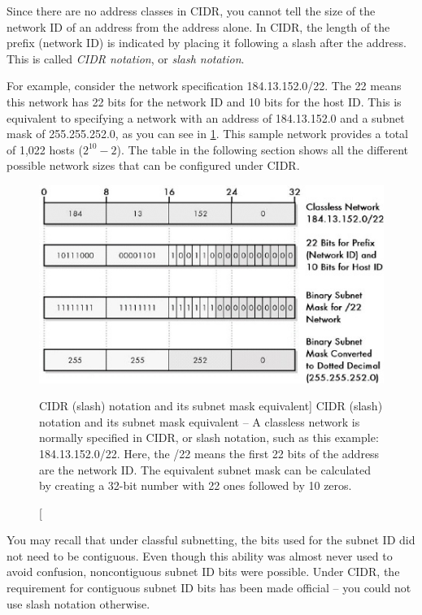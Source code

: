 \begin{keyconcept}
Since there are no address classes in CIDR, you cannot tell the size of the network ID of an address from the address alone.
In CIDR, the length of the prefix (network ID) is indicated by placing it following a slash after the address.
This is called \emph{CIDR notation}, or \emph{slash notation}.
\end{keyconcept}

For example, consider the network specification 184.13.152.0/22. The 22
means this network has 22 bits for the network ID and 10 bits for the
host ID. This is equivalent to specifying a network with an address of
184.13.152.0 and a subnet mask of 255.255.252.0, as you can see in \cref{fig:cidr-notation}.
This sample network provides a total of 1,022 hosts ($2^{10}-2$).
The table in the following section shows all the different possible network sizes that can be configured under CIDR.


\begin{figure}
   \centering
   \includegraphics[width=.7\textwidth]{images/cidr-notation.jpg}
   \caption
      [CIDR (slash) notation and its subnet mask equivalent]
      {CIDR (slash) notation and its subnet mask equivalent -- A
      classless network is normally specified in CIDR, or slash notation, such
      as this example: 184.13.152.0/22. Here, the /22 means the first 22 bits
      of the address are the network ID. The equivalent subnet mask can be
      calculated by creating a 32-bit number with 22 ones followed by 10
      zeros.}
   \label{fig:cidr-notation}
\end{figure}


\begin{note}
You may recall that under classful subnetting, the bits used for
the subnet ID did not need to be contiguous. Even though this ability
was almost never used to avoid confusion, noncontiguous subnet ID bits
were possible. Under CIDR, the requirement for contiguous subnet ID bits
has been made official -- you could not use slash notation otherwise.
\end{note}

